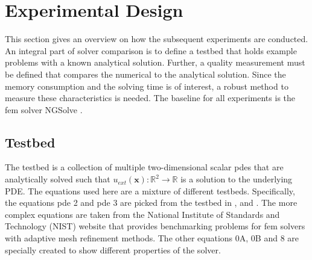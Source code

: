 \documentclass[./\jobname.tex]{subfiles}
\begin{document}
\section{Experimental Design}
This section gives an overview on how the subsequent experiments are conducted. An integral part of solver comparison is to define a testbed that holds example problems with a known analytical solution. Further, a quality measurement must be defined that compares the numerical to the analytical solution. Since the memory consumption and the solving time is of interest, a robust method to measure these characteristics is needed. The baseline for all experiments is the \gls{fem} solver NGSolve \cite{schoberl_ngsolvengsolve_2020}. 

\subsection{Testbed}
\label{chap:testbed_description}
The testbed is a collection of multiple two-dimensional scalar \gls{pde}s that are analytically solved such that $u_{ext}(\mathbf{x}): \mathbb{R}^2 \rightarrow \mathbb{R}$ is a solution to the underlying PDE. The equations used here are a mixture of different testbeds. Specifically, the equations \gls{pde} 2 and \gls{pde} 3 are picked from the testbed in \cite{chaquet_using_2019},  \cite{tsoulos_solving_2006} and \cite{panagant_solving_2014}. The more complex equations are taken from the National Institute of Standards and Technology (NIST) website \cite{mitchell_nist_2018} that provides benchmarking problems for \gls{fem} solvers with adaptive mesh refinement methods. The other equations 0A, 0B and 8 are specially created to show different properties of the solver. 
\end{document}
